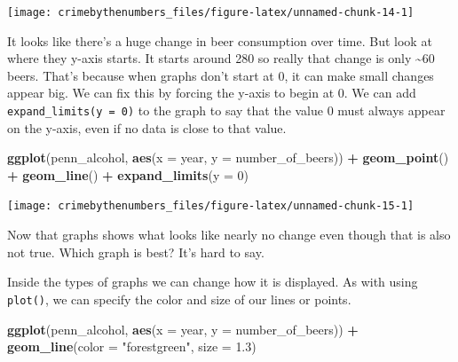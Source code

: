 \documentclass[
  12pt,
]{book}
\newenvironment{Shaded}{\begin{snugshade}}{\end{snugshade}}
\newcommand{\DataTypeTok}[1]{\textcolor[rgb]{0.27,0.27,0.27}{#1}}
\newcommand{\DecValTok}[1]{\textcolor[rgb]{0.06,0.06,0.06}{#1}}
\newcommand{\FloatTok}[1]{\textcolor[rgb]{0.06,0.06,0.06}{#1}}
\newcommand{\KeywordTok}[1]{\textcolor[rgb]{0.27,0.27,0.27}{\textbf{#1}}}
\newcommand{\NormalTok}[1]{#1}
\newcommand{\OperatorTok}[1]{\textcolor[rgb]{0.43,0.43,0.43}{\textbf{#1}}}
\newcommand{\StringTok}[1]{\textcolor[rgb]{0.5,0.5,0.5}{#1}}
\begin{document}
\begin{center}\texttt{[image: crimebythenumbers\_files/figure-latex/unnamed-chunk-14-1]} \end{center}

It looks like there's a huge change in beer consumption over time. But look at where they y-axis starts. It starts around 280 so really that change is only \textasciitilde60 beers. That's because when graphs don't start at 0, it can make small changes appear big. We can fix this by forcing the y-axis to begin at 0. We can add \texttt{expand\_limits(y\ =\ 0)} to the graph to say that the value 0 must always appear on the y-axis, even if no data is close to that value.

\begin{Shaded}
\begin{Highlighting}[]
\KeywordTok{ggplot}\NormalTok{(penn\_alcohol, }\KeywordTok{aes}\NormalTok{(}\DataTypeTok{x =}\NormalTok{ year, }\DataTypeTok{y =}\NormalTok{ number\_of\_beers)) }\OperatorTok{+}
\StringTok{  }\KeywordTok{geom\_point}\NormalTok{() }\OperatorTok{+}
\StringTok{  }\KeywordTok{geom\_line}\NormalTok{() }\OperatorTok{+}
\StringTok{  }\KeywordTok{expand\_limits}\NormalTok{(}\DataTypeTok{y =} \DecValTok{0}\NormalTok{)}
\end{Highlighting}
\end{Shaded}

\begin{center}\texttt{[image: crimebythenumbers\_files/figure-latex/unnamed-chunk-15-1]} \end{center}

Now that graphs shows what looks like nearly no change even though that is also not true. Which graph is best? It's hard to say.

Inside the types of graphs we can change how it is displayed. As with using \texttt{plot()}, we can specify the color and size of our lines or points.

\begin{Shaded}
\begin{Highlighting}[]
\KeywordTok{ggplot}\NormalTok{(penn\_alcohol, }\KeywordTok{aes}\NormalTok{(}\DataTypeTok{x =}\NormalTok{ year, }\DataTypeTok{y =}\NormalTok{ number\_of\_beers)) }\OperatorTok{+}
\StringTok{  }\KeywordTok{geom\_line}\NormalTok{(}\DataTypeTok{color =} \StringTok{"forestgreen"}\NormalTok{, }\DataTypeTok{size =} \FloatTok{1.3}\NormalTok{)}
\end{Highlighting}
\end{Shaded}
\end{document}
